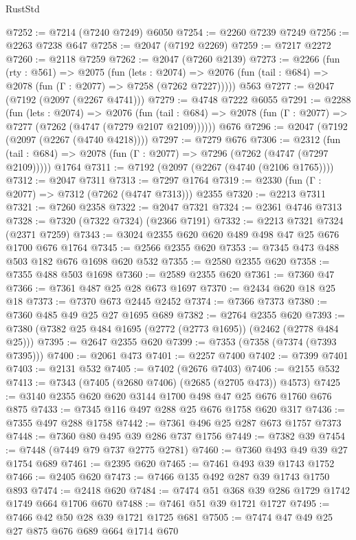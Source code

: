\begin{lexlean}{RustStd}
\begin{coremodule}
@7252 := @7214 (@7240 @7249) @6050
@7254 := @2260 @7239 @7249
@7256 := @2263 @7238 @647
@7258 := @2047 (@7192 @2269)
@7259 := @7217 @2272
@7260 := @2118 @7259
@7262 := @2047 (@7260 @2139)
@7273 := @2266
    (fun (rty : @561) =>
    @2075
      (fun (lets : @2074) =>
      @2076 (fun (tail : @684) => @2078 (fun (Γ : @2077) => @7258 (@7262 @7227)))))
    @563
@7277 := @2047 (@7192 (@2097 (@2267 @4741)))
@7279 := @4748 @7222 @6055
@7291 := @2288
    (fun (lets : @2074) =>
    @2076
      (fun (tail : @684) => @2078 (fun (Γ : @2077) => @7277 (@7262 (@4747 (@7279 @2107 @2109))))))
    @676
@7296 := @2047 (@7192 (@2097 (@2267 (@4740 @4218))))
@7297 := @7279 @676
@7306 := @2312
    (fun (tail : @684) => @2078 (fun (Γ : @2077) => @7296 (@7262 (@4747 (@7297 @2109)))))
    @1764
@7311 := @7192 (@2097 (@2267 (@4740 (@2106 @1765))))
@7312 := @2047 @7311
@7313 := @7297 @1764
@7319 := @2330 (fun (Γ : @2077) => @7312 (@7262 (@4747 @7313))) @2355
@7320 := @2213 @7311
@7321 := @7260 @2358
@7322 := @2047 @7321
@7324 := @2361 @4746 @7313
@7328 := @7320 (@7322 @7324) (@2366 @7191)
@7332 := @2213 @7321 @7324 (@2371 @7259)
@7343 := @3024 @2355 @620 @620 @489 @498 @47 @25 @676 @1700 @676 @1764
@7345 := @2566 @2355 @620
@7353 := @7345 @473 @488 @503 @182 @676 @1698 @620 @532
@7355 := @2580 @2355 @620
@7358 := @7355 @488 @503 @1698
@7360 := @2589 @2355 @620
@7361 := @7360 @47
@7366 := @7361 @487 @25 @28 @673 @1697
@7370 := @2434 @620 @18 @25 @18
@7373 := @7370 @673 @2445 @2452
@7374 := @7366 @7373
@7380 := @7360 @485 @49 @25 @27 @1695 @689
@7382 := @2764 @2355 @620
@7393 := @7380 (@7382 @25 @484 @1695 (@2772 (@2773 @1695)) (@2462 (@2778 @484 @25)))
@7395 := @2647 @2355 @620
@7399 := @7353 (@7358 (@7374 (@7393 @7395)))
@7400 := @2061 @473
@7401 := @2257 @7400
@7402 := @7399 @7401
@7403 := @2131 @532
@7405 := @7402 (@2676 @7403)
@7406 := @2155 @532
@7413 := @7343 (@7405 (@2680 @7406) (@2685 (@2705 @473)) @4573)
@7425 := @3140 @2355 @620 @620 @3144 @1700 @498 @47 @25 @676 @1760 @676 @875
@7433 := @7345 @116 @497 @288 @25 @676 @1758 @620 @317
@7436 := @7355 @497 @288 @1758
@7442 := @7361 @496 @25 @287 @673 @1757 @7373
@7448 := @7360 @80 @495 @39 @286 @737 @1756
@7449 := @7382 @39
@7454 := @7448 (@7449 @79 @737 @2775 @2781)
@7460 := @7360 @493 @49 @39 @27 @1754 @689
@7461 := @2395 @620
@7465 := @7461 @493 @39 @1743 @1752
@7466 := @2405 @620
@7473 := @7466 @135 @492 @287 @39 @1743 @1750 @893
@7474 := @2418 @620
@7484 := @7474 @51 @368 @39 @286 @1729 @1742 @1749 @664 @1706 @670
@7488 := @7461 @51 @39 @1721 @1727
@7495 := @7466 @42 @50 @28 @39 @1721 @1725 @681
@7505 := @7474 @47 @49 @25 @27 @875 @676 @689 @664 @1714 @670

\end{coremodule}
\end{lexlean}
